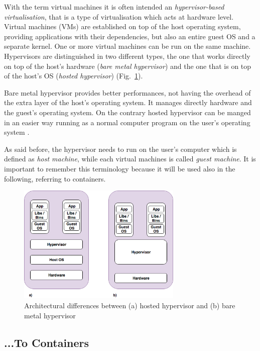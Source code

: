 \documentclass[a4paper,12pt]{article}
\def\myfig#1{Fig.~#1\xspace}
\begin{document}
With the term virtual machines it is often intended an \textit{hypervisor-based
virtualisation}, that is a type of virtualisation which acts at hardware level.
Virtual machines (VMs) are established on top of the host operating system,
providing applications with their dependencies, but also an entire guest OS and
a separate kernel. One or more virtual machines can be run on the same machine.
Hypervisors are distinguished in two different types, the one that works
directly on top of the host's hardware (\textit{bare metal hypervisor}) and the
one that is on top of the host's OS (\textit{hosted hypervisor})
(\myfig{\ref{fig:hypervisor_difference}}). \par Bare metal hypervisor provides
better performances, not having the overhead of the extra layer of the host's
operating system. It manages directly hardware and the guest's operating system.
On the contrary hosted hypervisor can be manged in an easier way running as a
normal computer program on the user's operating
system \cite{bui_docker_security}. \par As said before, the hypervisor needs to
run on the user's computer which is defined as \textit{host machine}, while each
virtual machines is called \textit{guest machine}. It is important to remember
this terminology because it will be used also in the following, referring to
containers. 

\begin{figure}[ht!]
  \centerline{\includegraphics[width=0.7\textwidth]{difference_bare_metal_hosted_hypervisor.png}}
  \caption{Architectural differences between (a) hosted hypervisor and (b) bare metal hypervisor}
  \label{fig:hypervisor_difference}
  \end{figure}


\subsection{...To Containers}
\end{document}
